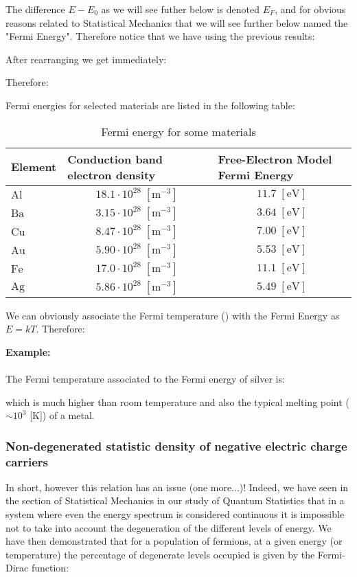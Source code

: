 	The difference $E-E_0$ as we will see futher below is denoted $E_F$, and for obvious reasons related to Statistical Mechanics that we will see further below named the "Fermi Energy". Therefore notice that we have using the previous results:
	
	After rearranging we get immediately:
	
	Therefore:
	
	Fermi energies for selected materials are listed in the following table:
	\begin{table}[H]
		\centering
		\begin{tabular}{|l|c|c|}
		\hline
		\rowcolor[HTML]{9B9B9B} 
		\textbf{Element} & \multicolumn{1}{l|}{\cellcolor[HTML]{9B9B9B}\textbf{Conduction band electron density}} & \multicolumn{1}{l|}{\cellcolor[HTML]{9B9B9B}\textbf{Free-Electron Model Fermi Energy}} \\ \hline
		$\mathrm{Al}$ & $18.1\cdot 10^{28}\;[\text{m}^{-3}]$ & $11.7\;[\text{eV}]$ \\ \hline
		$\mathrm{Ba}$ & $3.15\cdot 10^{28}\;[\text{m}^{-3}]$ & $3.64\;[\text{eV}]$ \\ \hline
		$\mathrm{Cu}$ & $8.47\cdot 10^{28}\;[\text{m}^{-3}]$ & $7.00\;[\text{eV}]$ \\ \hline
		$\mathrm{Au}$ & $5.90\cdot 10^{28}\;[\text{m}^{-3}]$ & $5.53\;[\text{eV}]$ \\ \hline
		$\mathrm{Fe}$ & $17.0\cdot 10^{28}\;[\text{m}^{-3}]$ & $11.1\;[\text{eV}]$ \\ \hline
		$\mathrm{Ag}$ & $5.86\cdot 10^{28}\;[\text{m}^{-3}]$ & $5.49\;[\text{eV}]$ \\ \hline
		\end{tabular}
		\caption{Fermi energy for some materials}
	\end{table}
	We can obviously associate the Fermi temperature () with the Fermi Energy as $E=kT$. Therefore:
	
	\begin{tcolorbox}[colframe=black,colback=white,sharp corners]
	\textbf{{\Large {}}Example:}\\\\
	The Fermi temperature associated to the Fermi energy of silver is:
	
	which is much higher than room temperature and also the typical melting point ($\sim 10^3$ [K]) of a metal.
	\end{tcolorbox}
	
	\subsubsection{Non-degenerated statistic density of negative electric charge carriers}
	In short, however this relation has an issue (one more...)! Indeed, we have seen in the section of Statistical Mechanics in our study of Quantum Statistics that in a system where even the energy spectrum is considered continuous it is impossible not to take into account the degeneration of the different levels of energy. We have then demonstrated that for a population of fermions, at a given energy (or temperature) the percentage of degenerate levels occupied is given by the Fermi-Dirac function:
	

